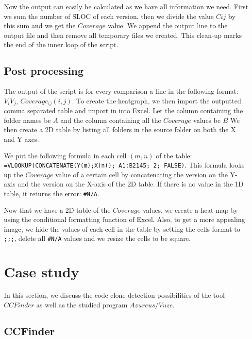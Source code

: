 \documentclass[a4paper,twoside, twocolumn, 11pt]{article}
\numberwithin{equation}{section}
\begin{document}
Now the output can easily be calculated as we have all information we need. 
First we sum the number of SLOC of each version, then we divide the value $Cij$ by this sum and we get the $Coverage$ value.
We append the output line to the output file and then remove all temporary files we created.
This clean-up marks the end of the inner loop of the script.

\subsection{Post processing}
The output of the script is for every comparison a line in the following format: $V_iV_j$, $Coverage_{ij}(i,j)$.
To create the heatgraph, we then import the outputted comma separated table and import in into Excel.
Let the column containing the folder names be $A$ and the column containing all the $Coverage$ values be $B$
We then create a 2D table by listing all folders in the source folder on both the X and Y axes.

We put the following formula in each cell $(m,n)$ of the table: 
\texttt{=VLOOKUP(CONCATENATE(Y(m);X(n)); A1:B2145; 2; FALSE)}.
This formula looks up the $Coverage$ value of a certain cell by concatenating the version on the Y-axis and the version on the X-axis of the 2D table.
If there is no value in the 1D table, it returns the error: \texttt{\#N/A}.

Now that we have a 2D table of the $Coverage$ values, we create a heat map by using the conditional formatting function of Excel.
Also, to get a more appealing image, we hide the values of each cell in the table by setting the cells format to \texttt{;;;}, delete all \texttt{\#N/A} values and we resize the cells to be square.


\section{Case study}
In this section, we discuss the code clone detection possibilities of the tool $CCFinder$ as well as the studied program $Azureus/Vuze$.

\subsection{CCFinder}
\end{document}
